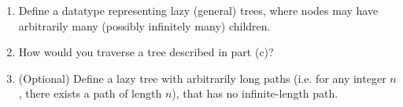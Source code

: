 \documentclass[11pt,a4paper]{article}
\begin{document}
\begin{enumerate}
\begin{enumerate}
    \item Define a datatype representing lazy (general) trees, where nodes may have arbitrarily many (possibly infinitely many) children.

    \item How would you traverse a tree described in part (c)?

    \item (Optional) Define a lazy tree with arbitrarily long paths (i.e. for any integer $n$, there exists a path of length $n$), that has no infinite-length path.
\end{enumerate}

\end{enumerate}
\end{document}
